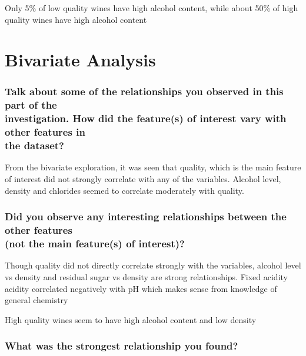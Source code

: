 \documentclass[]{article}
\begin{document}
Only 5\% of low quality wines have high alcohol content, while about
50\% of high quality wines have high alcohol content

\section{Bivariate Analysis}\label{bivariate-analysis}

\subsubsection{\texorpdfstring{Talk about some of the relationships you
observed in this part of the\\
investigation. How did the feature(s) of interest vary with other
features in\\
the
dataset?}{Talk about some of the relationships you observed in this part of the investigation. How did the feature(s) of interest vary with other features in the dataset?}}\label{talk-about-some-of-the-relationships-you-observed-in-this-part-of-the-investigation.-how-did-the-features-of-interest-vary-with-other-features-in-the-dataset}

From the bivariate exploration, it was seen that quality, which is the
main feature of interest did not strongly correlate with any of the
variables. Alcohol level, density and chlorides seemed to correlate
moderately with quality.

\subsubsection{\texorpdfstring{Did you observe any interesting
relationships between the other features\\
(not the main feature(s) of
interest)?}{Did you observe any interesting relationships between the other features (not the main feature(s) of interest)?}}\label{did-you-observe-any-interesting-relationships-between-the-other-features-not-the-main-features-of-interest}

Though quality did not directly correlate strongly with the variables,
alcohol level vs density and residual sugar vs density are strong
relationships. Fixed acidity acidity correlated negatively with pH which
makes sense from knowledge of general chemistry

High quality wines seem to have high alcohol content and low density

\subsubsection{What was the strongest relationship you
found?}\label{what-was-the-strongest-relationship-you-found}
\end{document}
